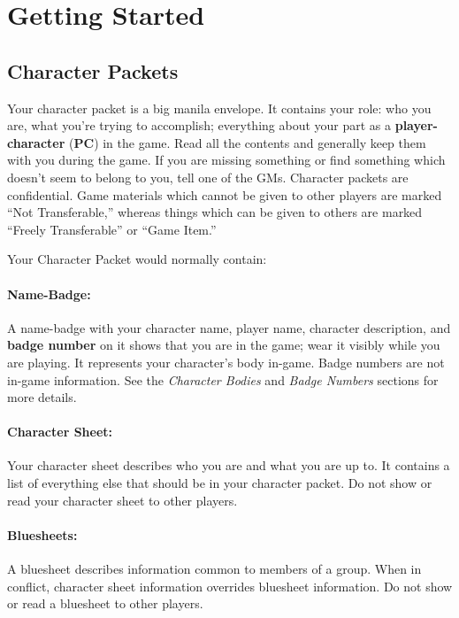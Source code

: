 \documentclass[sheet]{GL2020}
\begin{document}
\clearpage
\section{Getting Started}

\subsection{Character Packets}

Your character packet is a big manila envelope.  It contains your role: who you are, what you're trying to accomplish; everything about your part as a {\bf player-character} ({\bf PC}) in the game.  Read all the contents and generally keep them with you during the game.  If you are missing something or find something which doesn't seem to belong to you, tell one of the GMs.  Character packets are confidential.  Game materials which cannot be given to other players are marked ``Not Transferable,'' whereas things which can be given to others are marked ``Freely Transferable'' or ``Game Item.''

Your Character Packet would normally contain:

\paragraph{Name-Badge:} A name-badge with your character name, player name, character description, and {\bf badge number} on it shows that you are in the game; wear it visibly while you are playing.  It represents your character's body in-game.  Badge numbers are not in-game information. See the \emph{Character Bodies} and \emph{Badge Numbers} sections for more details.

\paragraph{Character Sheet:} Your character sheet describes who you are and what you are up to.  It contains a list of everything else that should be in your character packet.  Do not show or read your character sheet to other players.

\paragraph{Bluesheets:} A bluesheet describes information common to members of a group.  When in conflict, character sheet information overrides bluesheet information.  Do not show or read a bluesheet to other players.
\end{document}
